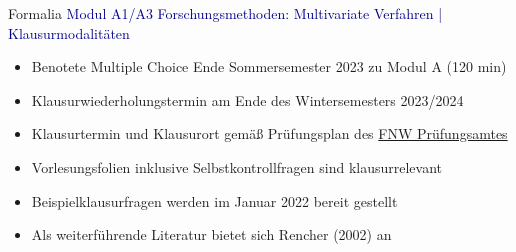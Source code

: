 \documentclass[
  8pt,
  ignorenonframetext,
]{beamer}
\providecommand{\tightlist}{%
  \setlength{\itemsep}{0pt}\setlength{\parskip}{0pt}}
\begin{document}
\begin{frame}{Formalia}
\protect\hypertarget{formalia-2}{}
\textcolor{darkblue}{Modul A1/A3 Forschungsmethoden: Multivariate Verfahren | Klausurmodalitäten}

\begin{itemize}
\tightlist
\item
  Benotete Multiple Choice Ende Sommersemester 2023 zu Modul A (120
  min)\\
\item
  Klausurwiederholungstermin am Ende des Wintersemesters 2023/2024\\
\item
  Klausurtermin und Klausurort gemäß Prüfungsplan des
  \href{https://www.fnw.ovgu.de/Studium/Pr\%C3\%BCfungsamt.html}{FNW
  Prüfungsamtes}
\item
  Vorlesungsfolien inklusive Selbstkontrollfragen sind klausurrelevant
\item
  Beispielklausurfragen werden im Januar 2022 bereit gestellt
\item
  Als weiterführende Literatur bietet sich Rencher (2002) an
\end{itemize}

\footnotesize
\end{frame}
\end{document}
